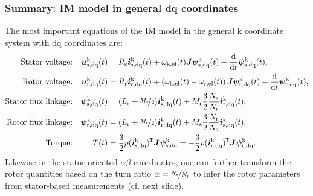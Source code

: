 \begin{frame}
	\frametitle{Summary: IM model in general dq coordinates}
    The most important equations of the IM model in the general k coordinate system with dq coordinates are:
    \begin{equation*}
        \begin{alignedat}{4}
            &&\mbox{Stator voltage:}&& \quad\bm{u}^\mathrm{k}_\mathrm{s,dq}(&t) &&= R_\mathrm{s} \bm{i}^\mathrm{k}_\mathrm{s,dq}(t)+ \omega_\mathrm{k,el}(t)\bm{J}\bm{\psi}^\mathrm{k}_\mathrm{s,dq}(t) + \frac{\mathrm{d}}{\mathrm{d}t}\bm{\psi}^\mathrm{k}_\mathrm{s,dq}(t),\\
            &&\mbox{Rotor voltage:}&& \quad\bm{u}^\mathrm{k}_\mathrm{r,dq}(&t) &&= R_\mathrm{r} \bm{i}^\mathrm{k}_\mathrm{r,dq}(t)+\left(\omega_\mathrm{k,el}(t)-\omega_\mathrm{r,el}(t)\right)\bm{J}\bm{\psi}^\mathrm{k}_\mathrm{r,dq}(t) + \frac{\mathrm{d}}{\mathrm{d}t}\bm{\psi}^\mathrm{k}_\mathrm{r,dq}(t),\\
            &&\mbox{Stator flux linkage:}&& \quad \bm{\psi}^\mathrm{k}_\mathrm{s,dq}(&t) &&= (L_\mathrm{s} +\nicefrac{M_\mathrm{s}}{2}) \bm{i}^\mathrm{k}_\mathrm{s,dq}(t) +  M_{\mathrm{r}}\frac{3}{2}\frac{N_\mathrm{s}}{N_\mathrm{r}} \bm{i}^\mathrm{k}_\mathrm{r,dq}(t),\\
            &&\mbox{Rotor flux linkage:}&& \quad \bm{\psi}^\mathrm{k}_\mathrm{r,dq}(&t) &&= (L_\mathrm{r} +\nicefrac{M_\mathrm{r}}{2}) \bm{i}^\mathrm{k}_\mathrm{r,dq}(t) +  M_{\mathrm{s}}\frac{3}{2}\frac{N_\mathrm{r}}{N_\mathrm{s}} \bm{i}^\mathrm{k}_\mathrm{s,dq}(t),\\
            &&\mbox{Torque:}&& \quad T(&t) &&= \frac{3}{2} p (\bm{i}_\mathrm{s,dq}^\mathrm{k})^{\mkern-1.5mu\mathsf{T}}\bm{J}\bm{\psi}_\mathrm{s,dq}^\mathrm{k}=-\frac{3}{2} p (\bm{i}^\mathrm{k}_\mathrm{r,dq})^{\mkern-1.5mu\mathsf{T}}\bm{J}\bm{\psi}^\mathrm{k}_\mathrm{r,dq}. 
        \end{alignedat}
    \end{equation*}
    Likewise in the stator-oriented $\alpha\beta$ coordinates, one can further transform the rotor quantities based on the turn ratio $\alpha = \nicefrac{N_\mathrm{s}}{N_\mathrm{r}}$ to infer the rotor parameters from stator-based measurements (cf. next slide).
\end{frame}


